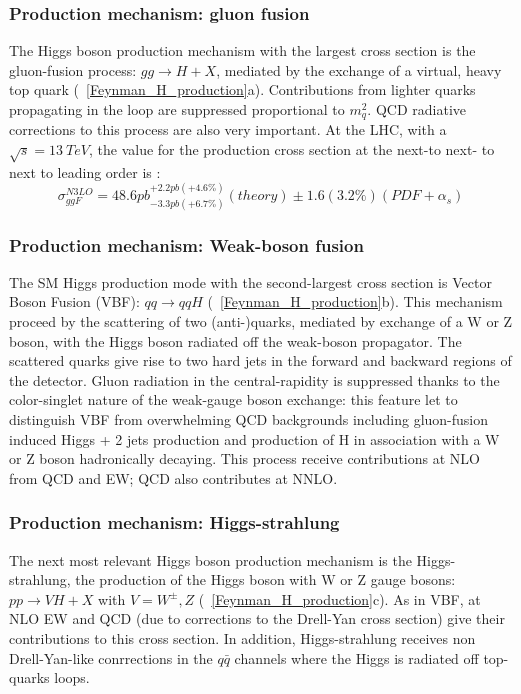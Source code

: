 \subsubsection{Production mechanism: gluon fusion}
The Higgs boson production mechanism with the largest cross section is the gluon-fusion process: $gg \to H + X$, mediated by the exchange of a virtual, heavy top quark (\figurename~\ref{Feynman_H_production}a). Contributions from lighter quarks propagating in the loop are suppressed proportional to $m_{q}^{2}$. QCD radiative corrections to this process are also very important. At the LHC, with a $\sqrt{s} = 13\ TeV$, the value for the production cross section at the next-to next- to next  to leading order is \cite{ggF_value}:
\begin{equation}
\sigma^{N3LO}_{ggF} = 48.6pb^{+2.2pb(+4.6\%)}_{-3.3pb(+6.7\%)}(theory) \pm 1.6(3.2\%)(PDF+\alpha_{s})
\label{ggH_cross_section}
\end{equation}
\subsubsection{Production mechanism: Weak-boson fusion}
The SM Higgs production mode with the second-largest cross section is Vector Boson Fusion (VBF): $qq \to qqH$ (\figurename~\ref{Feynman_H_production}b). This mechanism proceed by the scattering of two (anti-)quarks, mediated by exchange of a W or Z boson, with the Higgs boson radiated off the weak-boson propagator. The scattered quarks give rise to two hard jets in the forward and backward regions of the detector. Gluon radiation in the central-rapidity is suppressed thanks to the color-singlet nature of the weak-gauge boson exchange: this feature let to distinguish VBF from overwhelming QCD backgrounds including gluon-fusion induced Higgs + 2 jets production and production of H in association with a W or Z boson hadronically decaying. This process receive contributions at NLO from QCD and EW; QCD also contributes at NNLO.
\subsubsection{Production mechanism: Higgs-strahlung}
The next most relevant Higgs boson production mechanism is the Higgs-strahlung, the production of the Higgs boson with W or Z gauge bosons: $pp \to VH + X$ with $V = W^{\pm},Z$ (\figurename~\ref{Feynman_H_production}c). As in VBF, at NLO EW and QCD (due to corrections to the Drell-Yan cross section) give their contributions to this cross section. In addition, Higgs-strahlung receives non Drell-Yan-like conrrections in the $q\bar{q}$ channels where the Higgs is radiated off top-quarks loops.
